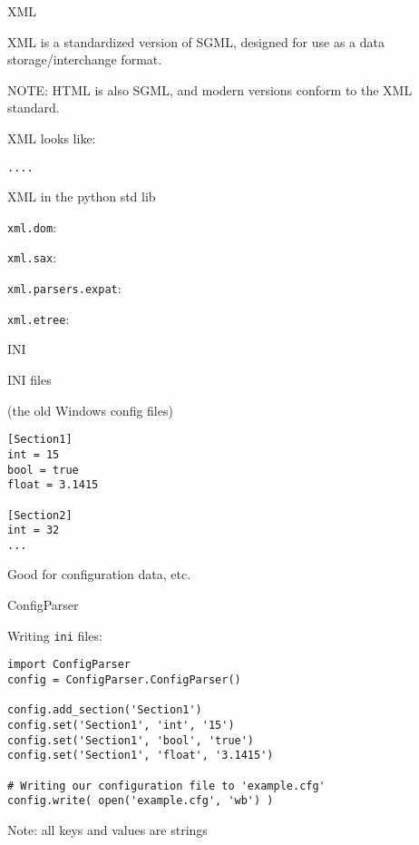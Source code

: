 \documentclass{beamer}
\begin{document}
\begin{frame}[fragile]{XML}

\vfill
{\Large XML is a standardized version of SGML, designed for use as a data
        storage/interchange format.}

\vfill
{\Large NOTE: HTML is also SGML, and modern versions conform to the XML standard.}

\vfill
{\Large XML looks like:}

\begin{verbatim} 
....
\end{verbatim} 

\end{frame} 

\begin{frame}[fragile]{XML in the python std lib}


\vfill
{\Large \verb|xml.dom|: }

\vfill
{\Large \verb|xml.sax|: }

\vfill
{\Large \verb|xml.parsers.expat|: }

\vfill
{\Large \verb|xml.etree|: }


\end{frame} 

\begin{frame}[fragile]{INI}

{\Large INI files}

(the old Windows config files)

\begin{verbatim}
[Section1]
int = 15
bool = true
float = 3.1415

[Section2]
int = 32
...
\end{verbatim}
\vfill
{\Large Good for configuration data, etc.}
\end{frame}

\begin{frame}[fragile]{ConfigParser}

{\Large Writing \verb|ini| files:}

\begin{verbatim}
import ConfigParser
config = ConfigParser.ConfigParser()

config.add_section('Section1')
config.set('Section1', 'int', '15')
config.set('Section1', 'bool', 'true')
config.set('Section1', 'float', '3.1415')

# Writing our configuration file to 'example.cfg'
config.write( open('example.cfg', 'wb') )
\end{verbatim}

\vfill
Note: all keys and values are strings
\end{frame}
\end{document}

